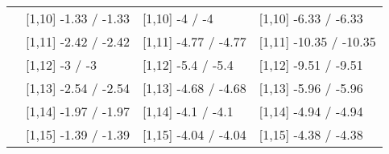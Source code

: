 \begin{table}
\begin{tabular}[t]{llll}
 & {}[1,10] -1.33  / -1.33 & {}[1,10] -4  / -4 & {}[1,10] -6.33  / -6.33\\
 & {}[1,11] -2.42  / -2.42 & {}[1,11] -4.77  / -4.77 & {}[1,11] -10.35  / -10.35\\
 & {}[1,12] -3  / -3 & {}[1,12] -5.4  / -5.4 & {}[1,12] -9.51  / -9.51\\
\addlinespace
 & {}[1,13] -2.54  / -2.54 & {}[1,13] -4.68  / -4.68 & {}[1,13] -5.96  / -5.96\\
 & {}[1,14] -1.97  / -1.97 & {}[1,14] -4.1  / -4.1 & {}[1,14] -4.94  / -4.94\\
 & {}[1,15] -1.39  / -1.39 & {}[1,15] -4.04  / -4.04 & {}[1,15] -4.38  / -4.38\\
\bottomrule
\end{tabular}
\end{table}
